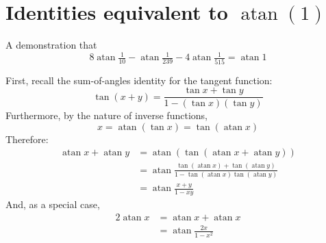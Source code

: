 \documentclass{report}
\newcommand{\vextra}{\vspace{2ex}}
\DeclareMathOperator{\atan}{atan}
\begin{document}
\chapter{Identities equivalent to $\atan(1)$}
A demonstration that
\begin{equation}\label{atan+10-239-515}
  8 \atan\tfrac{1}{10} -  \atan\tfrac{1}{239} - 4 \atan\tfrac{1}{515} =  \atan 1
\end{equation}

\vextra
First, recall the sum-of-angles identity for the tangent function:
\begin{equation*}
  \tan(x+y) = \frac{\tan x + \tan y}{1 - (\tan x)(\tan y)}
\end{equation*}
Furthermore, by the nature of inverse functions,
\begin{equation*}
  x = \atan(\tan x) = \tan(\atan x)
\end{equation*}
Therefore:
\begin{equation}
  \begin{aligned}
     \atan x + \atan y
       &= \atan\left( \tan( \atan x + \atan y ) \right) \\
       &= \atan \frac{\tan(\atan x) + \tan(\atan y)}{1 - \tan(\atan x) \tan(\atan y)} \\
       &= \atan \frac{x + y}{1 - x y}
  \end{aligned}
\end{equation}
And, as a special case,
\begin{equation}
  \begin{aligned}
    2 \atan x &= \atan x + \atan x\\
              &= \atan \frac{2x}{1-x^2}
  \end{aligned}
\end{equation}
\end{document}
